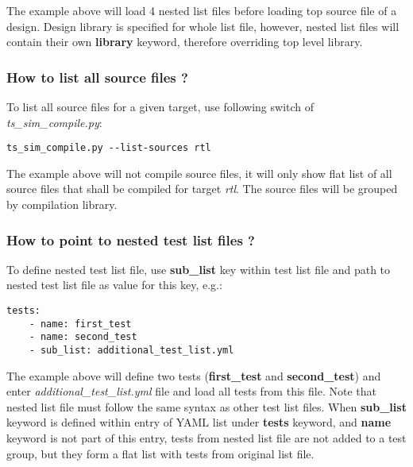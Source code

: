 \documentclass{tropic_design_spec}
\begin{document}
The example above will load 4 nested list files before loading top source file of
a design. Design library is specified for whole list file, however, nested list
files will contain their own \textbf{library} keyword, therefore overriding top
level library. 


\subsubsection{How to list all source files ?}
\label{sec:how-to-list-all-source-files}

To list all source files for a given target, use following switch of
\textit{ts_sim_compile.py}:

\begin{lstlisting}
ts_sim_compile.py --list-sources rtl
\end{lstlisting}

The example above will not compile source files, it will only show flat list
of all source files that shall be compiled for target \textit{rtl}. The source
files will be grouped by compilation library.


\subsubsection{How to point to nested test list files ?}
\label{sec:how-to-point-to-nested-test-list-files}

To define nested test list file, use \textbf{sub_list} key within test list file and
path to nested test list file as value for this key, e.g.:

\begin{lstlisting}
tests:
    - name: first_test
    - name: second_test
    - sub_list: additional_test_list.yml
\end{lstlisting}

The example above will define two tests (\textbf{first_test} and \textbf{second_test})
and enter \textit{additional_test_list.yml} file and load all tests from this file.
Note that nested list file must follow the same syntax as other test list files.
When \textbf{sub_list} keyword is defined within entry of YAML list under \textbf{tests}
keyword, and \textbf{name} keyword is not part of this entry, tests from nested
list file are not added to a test group, but they form a flat list with tests from
original list file.
\end{document}
